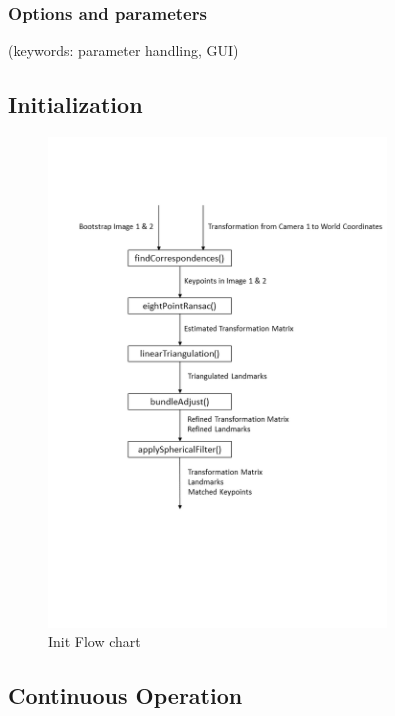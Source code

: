 \documentclass[a4paper,10pt]{article} %
\begin{document}
\subsubsection{Options and parameters}
(keywords: parameter handling, GUI)



\subsection{Initialization}
\label{sec_init}


\begin{figure}[ht]
	\includegraphics[width=0.8\textwidth]{init_chart}
	\caption{Init Flow chart}
	\label{img_flow_init}
\end{figure}


\subsection{Continuous Operation}
\label{sec_cont_op}
\end{document}
